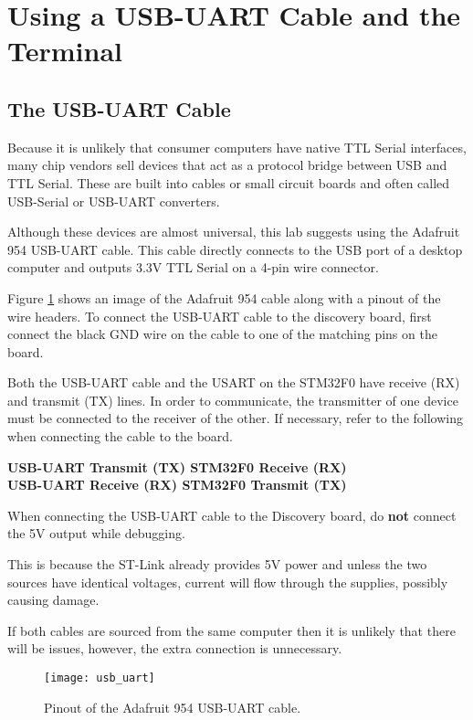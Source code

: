 \documentclass[11pt,fleqn]{book} %
\begin{document}
\section{Using a USB-UART Cable and the Terminal}
\subsection{The USB-UART Cable}
Because it is unlikely that consumer computers have native TTL Serial interfaces, many chip vendors sell devices that act as a protocol bridge between USB and TTL Serial. These are built into cables or small circuit boards and often called USB-Serial or USB-UART converters. 

Although these devices are almost universal, this lab suggests using the Adafruit 954 USB-UART cable. This cable directly connects to the USB port of a desktop computer and outputs 3.3V TTL Serial on a 4-pin wire connector. 

Figure \ref{usb_uart} shows an image of the Adafruit 954 cable along with a pinout of the wire headers. To connect the USB-UART cable to the discovery board, first connect the black GND wire on the cable to one of the matching pins on the board. 

Both the USB-UART cable and the USART on the STM32F0 have receive (RX) and transmit (TX) lines. In order to communicate, the transmitter of one device must be connected to the receiver of the other. If necessary, refer to the following when connecting the cable to the board. \\

\parbox{\textwidth} {
    \centering
    \textbf{USB-UART Transmit (TX) \textrightarrow  STM32F0 Receive (RX) \\
    USB-UART Receive (RX) \textrightarrow  STM32F0 Transmit (TX)}
}
    

\begin{warning}
    When connecting the USB-UART cable to the Discovery board, do \textbf{not} connect the 5V output while debugging. 
    
    This is because the ST-Link already provides 5V power and unless the two sources have identical voltages, current will flow through the supplies, possibly causing damage. 
    
    If both cables are sourced from the same computer then it is unlikely that there will be issues, however, the extra connection is unnecessary.
\end{warning}

\begin{figure}[]
    \centering\texttt{[image: usb\_uart]}
    \caption{Pinout of the Adafruit 954 USB-UART cable.}
    \label{usb_uart}
\end{figure}
\end{document}
